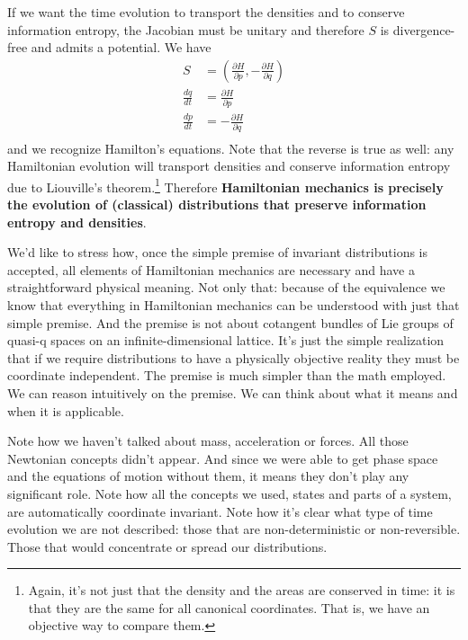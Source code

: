 \documentclass[11pt]{article}
\begin{document}
If we want the time evolution to transport the densities and to conserve information entropy, the Jacobian must be unitary and therefore $S$ is divergence-free and admits a potential. We have
\begin{equation}
\label{Potential_Hamilton}
\begin{aligned}
S &= \left(\frac{\partial H}{\partial p}, - \frac{\partial H}{\partial q}\right) \\
\frac{dq}{dt} &= \frac{\partial H}{\partial p}  \\
\frac{dp}{dt} &= - \frac{\partial H}{\partial q}  \\
\end{aligned}
\end{equation}
and we recognize Hamilton's equations. Note that the reverse is true as well: any Hamiltonian evolution will transport densities and conserve information entropy due to Liouville's theorem.\footnote{Again, it's not just that the density and the areas are conserved in time: it is that they are the same for all canonical coordinates. That is, we have an objective way to compare them.} Therefore \textbf{Hamiltonian mechanics is precisely the evolution of (classical) distributions that preserve information entropy and densities}.

We'd like to stress how, once the simple premise of invariant distributions is accepted, all elements of Hamiltonian mechanics are necessary and have a straightforward physical meaning. Not only that: because of the equivalence we know that everything in Hamiltonian mechanics can be understood with just that simple premise. And the premise is not about cotangent bundles of Lie groups of quasi-q spaces on an infinite-dimensional lattice. It's just the simple realization that if we require distributions to have a physically objective reality they must be coordinate independent. The premise is much simpler than the math employed. We can reason intuitively on the premise. We can think about what it means and when it is applicable.

Note how we haven't talked about mass, acceleration or forces. All those Newtonian concepts didn't appear. And since we were able to get phase space and the equations of motion without them, it means they don't play any significant role. Note how all the concepts we used, states and parts of a system, are automatically coordinate invariant. Note how it's clear what type of time evolution we are not described: those that are non-deterministic or non-reversible. Those that would concentrate or spread our distributions.
\end{document}

